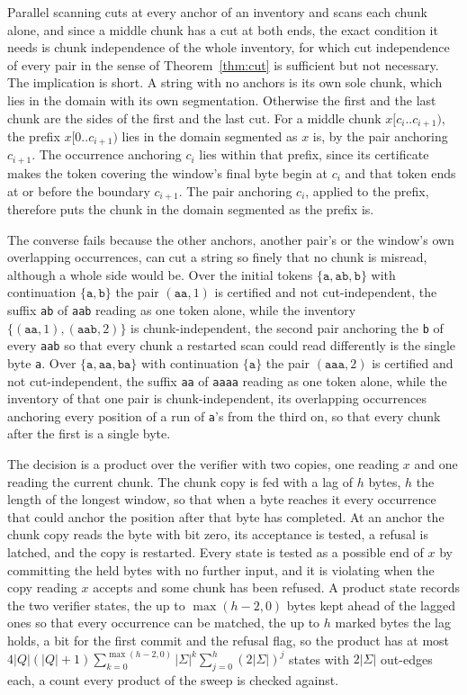 \documentclass[11pt,a4paper]{article}
\theoremstyle{definition}
\theoremstyle{plain}
\newcommand{\code}[1]{\texttt{#1}}
\begin{document}
Parallel scanning cuts at every anchor of an inventory and scans each chunk alone, and since a middle chunk has a cut at
both ends, the exact condition it needs is chunk independence of the whole inventory, for which cut independence of
every pair in the sense of Theorem~\ref{thm:cut} is sufficient but not necessary. The implication is short. A string
with no anchors is its own sole chunk, which lies in the domain with its own segmentation. Otherwise the first and the
last chunk are the sides of the first and the last cut. For a middle chunk $x[c_i..c_{i+1})$, the prefix $x[0..c_{i+1})$
lies in the domain segmented as $x$ is, by the pair anchoring $c_{i+1}$. The occurrence anchoring $c_i$ lies within that
prefix, since its certificate makes the token covering the window's final byte begin at $c_i$ and that token ends at or
before the boundary $c_{i+1}$. The pair anchoring $c_i$, applied to the prefix, therefore puts the chunk in the domain
segmented as the prefix is.

The converse fails because the other anchors, another pair's or the window's own overlapping occurrences, can cut a
string so finely that no chunk is misread, although a whole side would be. Over the initial tokens
$\{\code{a}, \code{ab}, \code{b}\}$ with continuation $\{\code{a}, \code{b}\}$ the pair $(\code{aa}, 1)$ is certified
and not cut-independent, the suffix \code{ab} of \code{aab} reading as one token alone, while the inventory
$\{(\code{aa}, 1), (\code{aab}, 2)\}$ is chunk-independent, the second pair anchoring the \code{b} of every \code{aab}
so that every chunk a restarted scan could read differently is the single byte \code{a}. Over
$\{\code{a}, \code{aa}, \code{ba}\}$ with continuation $\{\code{a}\}$ the pair $(\code{aaa}, 2)$ is certified and not
cut-independent, the suffix \code{aa} of \code{aaaa} reading as one token alone, while the inventory of that one pair is
chunk-independent, its overlapping occurrences anchoring every position of a run of \code{a}'s from the third on, so
that every chunk after the first is a single byte.

The decision is a product over the verifier with two copies, one reading $x$ and one reading the current chunk. The
chunk copy is fed with a lag of $h$ bytes, $h$ the length of the longest window, so that when a byte reaches it every
occurrence that could anchor the position after that byte has completed. At an anchor the chunk copy reads the byte with
bit zero, its acceptance is tested, a refusal is latched, and the copy is restarted. Every state is tested as a possible
end of $x$ by committing the held bytes with no further input, and it is violating when the copy reading $x$ accepts and
some chunk has been refused. A product state records the two verifier states, the up to $\max(h-2,0)$ bytes kept ahead
of the lagged ones so that every occurrence can be matched, the up to $h$ marked bytes the lag holds, a bit for the
first commit and the refusal flag, so the product has at most
$4|Q|(|Q|+1)\sum_{k=0}^{\max(h-2,0)}|\Sigma|^k\sum_{j=0}^{h}(2|\Sigma|)^j$ states with $2|\Sigma|$ out-edges each, a
count every product of the sweep is checked against.
\end{document}
